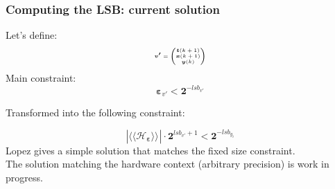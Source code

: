 \begin{frame}
	\frametitle{Computing the LSB: current solution}
	Let's define:%
			\begin{equation}
				\tiny
				\boldsymbol{v'}=
				\begin{pmatrix}
					\boldsymbol{t}(k+1) \\
					\boldsymbol{x}(k+1) \\
					\boldsymbol{y}(k)   \\
				\end{pmatrix}
			\end{equation}
	Main constraint:
		\begin{equation} \label{constraint}
			\boldsymbol{\varepsilon}_{v'} < \boldsymbol{2}^{-lsb_{v'}}
		\end{equation}

	Transformed into the following constraint:

		\begin{equation} \label{constraint}
			| \langle\langle \mathcal{H}_{\boldsymbol{\varepsilon}} \rangle\rangle_{} | \cdot \boldsymbol{2}^{lsb_{v'}+1} < \boldsymbol{2}^{-lsb_{y_i}}
		\end{equation}
	Lopez gives a simple solution that matches the fixed size constraint.\\
	The solution matching the hardware context (arbitrary precision) is work in progress.

\end{frame}

